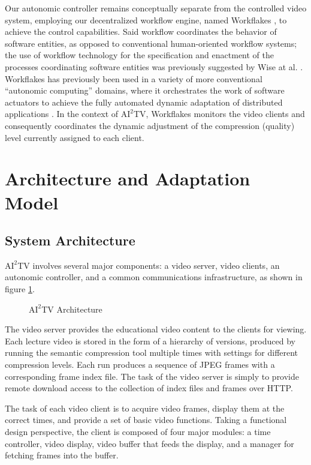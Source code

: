 \documentclass{sig-alternate}
\begin{document}
Our autonomic controller remains conceptually separate from the
controlled video system, employing our decentralized workflow engine,
named Workflakes \cite{ValettoThesis}, to achieve the control
capabilities.  Said workflow coordinates the behavior of software
entities, as opposed to conventional human-oriented workflow systems;
the use of workflow technology for the specification and enactment of
the processes coordinating software entities was previously suggested
by Wise at al. \cite{OSTERWEIL}.  Workflakes has previously been used
in a variety of more conventional ``autonomic computing'' domains,
where it orchestrates the work of software actuators to achieve the
fully automated dynamic adaptation of distributed applications
\cite{ICSE,AMS,AMSJournal}.  In the context of $\mathrm{AI}^2$TV,
Workflakes monitors the video clients and consequently coordinates the
dynamic adjustment of the compression (quality) level currently
assigned to each client.

\section{Architecture and Adaptation\\ Model}

\subsection{System Architecture}

$\mathrm{AI}^2$TV involves several major components: a video server,
video clients, an autonomic controller, and a common communications
infrastructure, as shown in figure \ref{ai2tv_arch}.

\begin{figure}
  \centering
  \caption{$\mathrm{AI}^2$TV Architecture}
  \label{ai2tv_arch}
\end{figure}

The video server provides the educational video content to the clients
for viewing.  Each lecture video is stored in the form of a hierarchy
of versions, produced by running the semantic compression tool
multiple times with settings for different compression levels. Each
run produces a sequence of JPEG frames with a corresponding frame
index file.  The task of the video server is simply to provide remote
download access to the collection of index files and frames over HTTP.

The task of each video client is to acquire video frames, display them
at the correct times, and provide a set of basic video functions.
Taking a functional design perspective, the client is composed of four
major modules: a time controller, video display, video buffer that
feeds the display, and a manager for fetching frames into the buffer.
\end{document}
